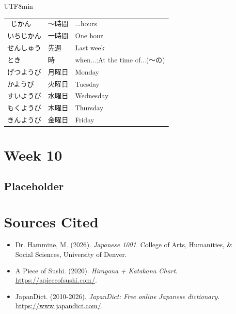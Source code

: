 \documentclass[11pt]{article}
\begin{document}
\begin{CJK}{UTF8}{min}
\begin{tabularx}{\linewidth}{X | X | X}
    ~じかん & 〜時間 & ...hours \\
    いちじかん & 一時間 & One hour \\
    せんしゅう & 先週 & Last week \\
    とき & 時 & when...;At the time of...(〜の) \\
    げつようび & 月曜日 & Monday \\
    かようび & 火曜日 & Tuesday \\
    すいようび & 水曜日 & Wednesday \\
    もくようび & 木曜日 & Thursday \\
    きんようび & 金曜日 & Friday \\
    \bottomrule
\end{tabularx}


\newpage
\section{Week 10}

\subsection{Placeholder}


\newpage
\section{Sources Cited}

\begin{itemize}
    \item Dr. Hammine, M. (2026).  \emph{Japanese 1001}. College of Arts, Humanities, \& Social Sciences, University of Denver.
    \item A Piece of Sushi. (2020). \emph{Hiragana + Katakana Chart}. \url{https://apieceofsushi.com/}.
    \item JapanDict. (2010-2026). \emph{JapanDict: Free online Japanese dictionary}. \url{https://www.japandict.com/}.
\end{itemize}


\end{CJK}
\end{document}
